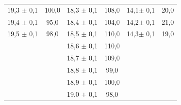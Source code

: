 \documentclass[titlepage = firstcover]{scrartcl}
\begin{document}
\begin{table}
\begin{tabular} {c c c c c c}
                19,3 $\pm$ 0,1	& 100,0  & 18,3 $\pm$ 0,1  & 108,0  & 14,1$\pm$ 0,1 & 20,0 \\
                19,4 $\pm$ 0,1	& 95,0   & 18,4 $\pm$ 0,1  & 104,0  & 14,2$\pm$ 0,1 & 21,0 \\
                19,5 $\pm$ 0,1	& 98,0   & 18,5 $\pm$ 0,1  & 110,0  & 14,3$\pm$ 0,1 & 19,0 \\
                              &          & 18,6 $\pm$ 0,1  & 110,0  &               &      \\
                              &          & 18,7 $\pm$ 0,1  & 109,0  &               &      \\
                              &          & 18,8 $\pm$ 0,1  & 99,0   &               &      \\
                              &          & 18,9 $\pm$ 0,1  & 100,0  &               &      \\
                              &          & 19,0 $\pm$ 0,1  & 98,0   &               &      \\
                \bottomrule  
              \end{tabular}
            \end{table}
\end{document}
